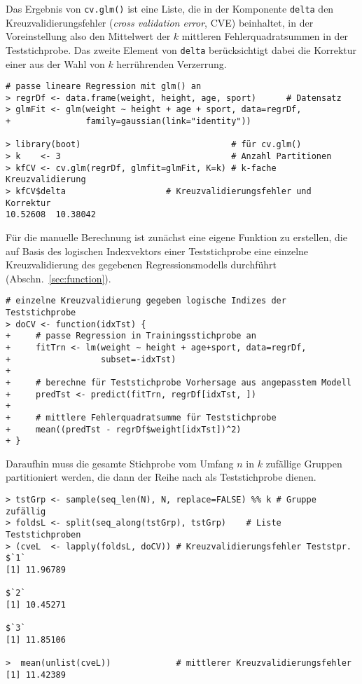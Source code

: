 Das Ergebnis von \lstinline!cv.glm()! ist eine Liste, die in der Komponente \lstinline!delta! den Kreuzvalidierungsfehler (\emph{cross validation error}, CVE) beinhaltet, in der Voreinstellung also den Mittelwert der $k$ mittleren Fehlerquadratsummen in der Teststichprobe. Das zweite Element von \lstinline!delta! berücksichtigt dabei die Korrektur einer aus der Wahl von $k$ herrührenden Verzerrung.
\begin{lstlisting}
# passe lineare Regression mit glm() an
> regrDf <- data.frame(weight, height, age, sport)      # Datensatz
> glmFit <- glm(weight ~ height + age + sport, data=regrDf,
+               family=gaussian(link="identity"))

> library(boot)                              # für cv.glm()
> k    <- 3                                  # Anzahl Partitionen
> kfCV <- cv.glm(regrDf, glmfit=glmFit, K=k) # k-fache Kreuzvalidierung
> kfCV$delta                    # Kreuzvalidierungsfehler und Korrektur
10.52608  10.38042
\end{lstlisting}

Für die manuelle Berechnung ist zunächst eine eigene Funktion zu erstellen, die auf Basis des logischen Indexvektors einer Teststichprobe eine einzelne Kreuzvalidierung des gegebenen Regressionsmodells durchführt (Abschn.\ \ref{sec:function}).
\begin{lstlisting}
# einzelne Kreuzvalidierung gegeben logische Indizes der Teststichprobe
> doCV <- function(idxTst) {
+     # passe Regression in Trainingsstichprobe an
+     fitTrn <- lm(weight ~ height + age+sport, data=regrDf,
+                  subset=-idxTst)
+
+     # berechne für Teststichprobe Vorhersage aus angepasstem Modell
+     predTst <- predict(fitTrn, regrDf[idxTst, ])
+
+     # mittlere Fehlerquadratsumme für Teststichprobe
+     mean((predTst - regrDf$weight[idxTst])^2)
+ }
\end{lstlisting}

Daraufhin muss die gesamte Stichprobe vom Umfang $n$ in $k$ zufällige Gruppen partitioniert werden, die dann der Reihe nach als Teststichprobe dienen.
\begin{lstlisting}
> tstGrp <- sample(seq_len(N), N, replace=FALSE) %% k # Gruppe zufällig
> foldsL <- split(seq_along(tstGrp), tstGrp)    # Liste Teststichproben
> (cveL  <- lapply(foldsL, doCV)) # Kreuzvalidierungsfehler Teststpr.
$`1`
[1] 11.96789

$`2`
[1] 10.45271

$`3`
[1] 11.85106

>  mean(unlist(cveL))             # mittlerer Kreuzvalidierungsfehler
[1] 11.42389
\end{lstlisting}

